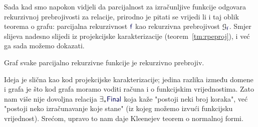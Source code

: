 Sada kad smo napokon vidjeli da parcijalnost za izračunljive funkcije odgovara rekurzivnoj prebrojivosti za relacije, prirodno je pitati se vrijedi li i taj oblik teorema o grafu: parcijalna rekurzivnost $\f f$ kao rekurzivna prebrojivost $\graf{\f f}$. Smjer slijeva nadesno slijedi iz projekcijske karakterizacije (teorem~\ref{tm:rpeproj}), i već ga sada možemo dokazati.

\begin{teorem}[{name=[rekurzivna prebrojivost grafova parcijalno rekurzivnih funkcija]}]\label{tm:grafprre}
Graf svake parcijalno rekurzivne funkcije je rekurzivno prebrojiv.
\end{teorem}

Ideja je slična kao kod projekcijske karakterizacije; jedina razlika između domene i grafa je što kod grafa moramo voditi računa i o funkcijskim vrijednostima. Zato nam više nije dovoljna relacija $\exists_*\f{Final}$ koja kaže "postoji neki broj koraka", već "postoji neko izračunavanje koje stane" (iz kojeg možemo izvući funkcijsku vrijednost). Srećom, upravo to nam daje Kleenejev teorem o normalnoj formi.

